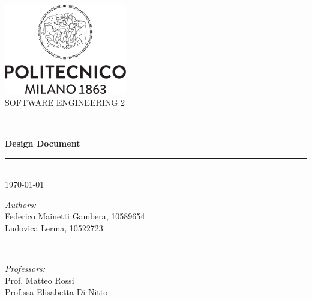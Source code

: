 


        \AddToShipoutPicture*{\BackgroundPic}
        {\color{white}
        \begin{titlepage}
                \center

                \includegraphics[width=0.4\textwidth]{Images/Logo_Politecnico_Milano.png}\\[2cm]

                \textsc{\huge SOFTWARE ENGINEERING 2}\\[1cm]

                \newcommand{\HRule}{\rule{\linewidth}{0.10mm}}
                \HRule \\[0.40cm]
                { \Huge \bfseries Design Document}\\[0.14cm]
                \HRule \\ [0.16cm]

                {\Large \today}\\[1cm]

                \vfill
                {\color{black}
                \begin{minipage}{0.59\textwidth}
                        \begin{flushleft} \Large
                                \emph{Authors:}\\
                                Federico Mainetti Gambera, 10589654\\
                                Ludovica Lerma, 10522723\\
                        \end{flushleft}
                \end{minipage}
                        ~
                \begin{minipage}{0.39\textwidth}
                        \begin{flushright} \Large
                                \emph{Professors:}\\
                                Prof. Matteo Rossi \\
                                Prof.ssa Elisabetta Di Nitto \\
                        \end{flushright}
                \end{minipage}\\[1cm]
                }
        \end{titlepage}
        }
